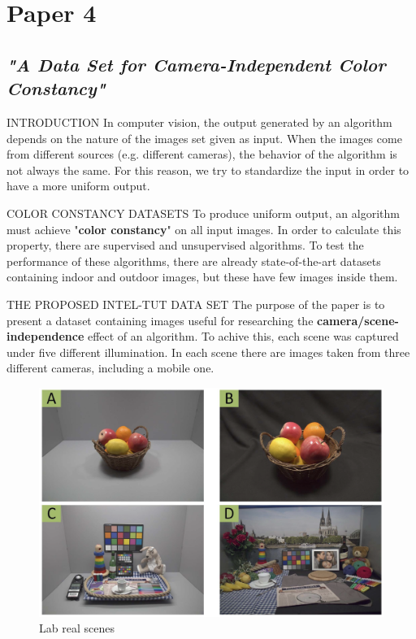 \section{Paper 4}
\subsection{\emph{"A Data Set for Camera-Independent Color Constancy"}}

\begin{frame}{INTRODUCTION}
    In computer vision, the output generated by an algorithm depends on the 
    nature of the images set given as input. When the images come from 
    different sources (e.g. different cameras), the behavior of the algorithm is 
    not always the same. For this reason, we try to standardize the input in 
    order to have a more uniform output.
\end{frame}

\begin{frame}{COLOR CONSTANCY DATASETS}
    To produce uniform output, an algorithm must achieve "{\bfseries{color 
    constancy}}" on all input images. In order to calculate this property, there 
    are supervised and unsupervised algorithms. To test the performance of 
    these algorithms, there are already state-of-the-art datasets   
    containing indoor and outdoor images, but these have few images inside 
    them.
\end{frame}

\begin{frame}{THE PROPOSED INTEL-TUT DATA SET}
    The purpose of the paper is to present a dataset containing images useful 
    for researching the {\bfseries{camera/scene-independence}} effect of an algorithm.
    To achive this, each scene was captured under five different illumination. 
    In each scene there are images taken from three different cameras, 
    including a mobile one.
    \begin{figure}[htbp]
        \centering
        \includegraphics[width = 0.6 \linewidth]{images/paper4/lab.png}
        \centering
        \caption{Lab real scenes}
        \label{fig:Lab}
    \end{figure}
\end{frame}

